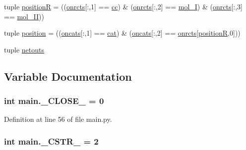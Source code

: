\begin{DoxyCompactItemize}
\item 
tuple \hyperlink{a00153_adbbdc0f6ad0f08400b3e492f7a807a6b}{position\+R} = ((\hyperlink{a00153_ab26ffc3eda5d201a779d705813b06348}{onrcts}\mbox{[}\+:,1\mbox{]} == \hyperlink{a00028_afb5980388a6e55ca55437b53cdaf528a}{cc}) \& (\hyperlink{a00153_ab26ffc3eda5d201a779d705813b06348}{onrcts}\mbox{[}\+:,2\mbox{]} == \hyperlink{a00028_ab346189eef5359a07ba32144ddcd4465}{mol\+\_\+\+I}) \& (\hyperlink{a00153_ab26ffc3eda5d201a779d705813b06348}{onrcts}\mbox{[}\+:,3\mbox{]} == \hyperlink{a00028_a4d2c086887289f8900b38ffa56854da3}{mol\+\_\+\+I\+I}))
\item 
tuple \hyperlink{a00153_ac67c60df3cc9afae7e4888d2b48b846d}{position} = ((\hyperlink{a00153_ab4d380bc4bfcb970acc39ddf18a73972}{oncats}\mbox{[}\+:,1\mbox{]} == \hyperlink{a00028_a7073f71a43389f3032e69b1fffc2551a}{cat}) \& (\hyperlink{a00153_ab4d380bc4bfcb970acc39ddf18a73972}{oncats}\mbox{[}\+:,2\mbox{]} == \hyperlink{a00153_ab26ffc3eda5d201a779d705813b06348}{onrcts}\mbox{[}\hyperlink{a00153_adbbdc0f6ad0f08400b3e492f7a807a6b}{position\+R},0\mbox{]}))
\item 
tuple \hyperlink{a00153_a02c2194d4e56d3d8c6d2c204a8017e3a}{netouts}
\end{DoxyCompactItemize}


\subsection{Variable Documentation}
\hypertarget{a00153_a05832bb8aa5b5b63ca022653c9b32af5}{
\subsubsection[{\+\_\+\+C\+L\+O\+S\+E\+\_\+}]{\setlength{\rightskip}{0pt plus 5cm}int main.\+\_\+\+C\+L\+O\+S\+E\+\_\+ = 0}}\label{a00153_a05832bb8aa5b5b63ca022653c9b32af5}


Definition at line 56 of file main.\+py.

\hypertarget{a00153_a4994448f45a50087ae8864153ab89e10}{
\subsubsection[{\+\_\+\+C\+S\+T\+R\+\_\+}]{\setlength{\rightskip}{0pt plus 5cm}int main.\+\_\+\+C\+S\+T\+R\+\_\+ = 2}}\label{a00153_a4994448f45a50087ae8864153ab89e10}


